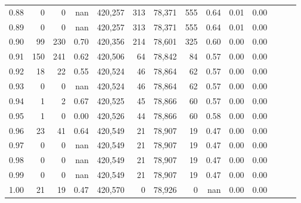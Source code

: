 \begin{tabular}{rrrrrrrrrrrrrr}
0.88 &       0 &      0 &   nan &  420,257 &      313 &  78,371 &     555 &  0.64 &  0.01 &      0.00 \\
0.89 &       0 &      0 &   nan &  420,257 &      313 &  78,371 &     555 &  0.64 &  0.01 &      0.00 \\
0.90 &      99 &    230 &  0.70 &  420,356 &      214 &  78,601 &     325 &  0.60 &  0.00 &      0.00 \\
0.91 &     150 &    241 &  0.62 &  420,506 &       64 &  78,842 &      84 &  0.57 &  0.00 &      0.00 \\
0.92 &      18 &     22 &  0.55 &  420,524 &       46 &  78,864 &      62 &  0.57 &  0.00 &      0.00 \\
0.93 &       0 &      0 &   nan &  420,524 &       46 &  78,864 &      62 &  0.57 &  0.00 &      0.00 \\
0.94 &       1 &      2 &  0.67 &  420,525 &       45 &  78,866 &      60 &  0.57 &  0.00 &      0.00 \\
0.95 &       1 &      0 &  0.00 &  420,526 &       44 &  78,866 &      60 &  0.58 &  0.00 &      0.00 \\
0.96 &      23 &     41 &  0.64 &  420,549 &       21 &  78,907 &      19 &  0.47 &  0.00 &      0.00 \\
0.97 &       0 &      0 &   nan &  420,549 &       21 &  78,907 &      19 &  0.47 &  0.00 &      0.00 \\
0.98 &       0 &      0 &   nan &  420,549 &       21 &  78,907 &      19 &  0.47 &  0.00 &      0.00 \\
0.99 &       0 &      0 &   nan &  420,549 &       21 &  78,907 &      19 &  0.47 &  0.00 &      0.00 \\
1.00 &      21 &     19 &  0.47 &  420,570 &        0 &  78,926 &       0 &   nan &  0.00 &      0.00 \\
\bottomrule
\end{tabular}
